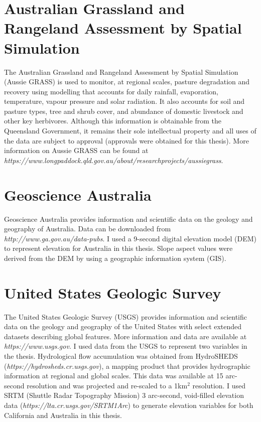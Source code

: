 \section{Australian Grassland and Rangeland Assessment by Spatial Simulation}

The Australian Grassland and Rangeland Assessment by Spatial Simulation (Aussie GRASS) is used to monitor, at regional scales, pasture degradation and recovery using modelling that accounts for daily rainfall, evaporation, temperature, vapour pressure and solar radiation. It also accounts for soil and pasture types, tree and shrub cover, and abundance of domestic livestock and other key herbivores. Although this information is obtainable from the Queensland Government, it remains their sole intellectual property and all uses of the data are subject to approval (approvals were obtained for this thesis). More information on Aussie GRASS can be found at \textit{https://www.longpaddock.qld.gov.au/about/researchprojects/aussiegrass}.

\section{Geoscience Australia}

Geoscience Australia provides information and scientific data on the geology and geography of Australia. Data can be downloaded from \textit{http://www.ga.gov.au/data-pubs}. I used a 9-second digital elevation model (DEM) to represent elevation for Australia in this thesis. Slope aspect values were derived from the DEM by using a geographic information system (GIS).

\section{United States Geologic Survey}

The United States Geologic Survey (USGS) provides information and scientific data on the geology and geography of the United States with select extended datasets describing global features. More information and data are available at \textit{https://www.usgs.gov}. I used data from the USGS to represent two variables in the thesis. Hydrological flow accumulation was obtained from HydroSHEDS (\textit{https://hydrosheds.cr.usgs.gov}), a mapping product that provides hydrographic information at regional and global scales. This data was available at 15 arc-second resolution and was projected and re-scaled to a 1km$^2$ resolution. I used SRTM (Shuttle Radar Topography Mission) 3 arc-second, void-filled elevation data (\textit{https://lta.cr.usgs.gov/SRTM1Arc}) to generate elevation variables for both California and Australia in this thesis.

